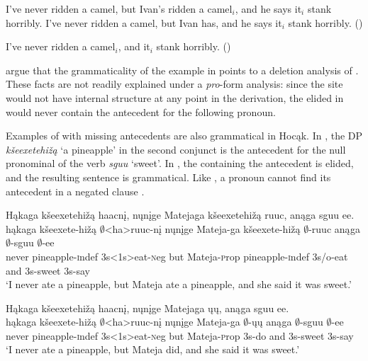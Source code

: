 \documentclass[output=paper]{LSP/langsci}
\begin{document}
 
\ea
\ea\label{ex:johnson:49a}
I've never ridden a camel, but Ivan's ridden a camel$_i$, and he says it$_i$ stank horribly.
\vspace{12pt}
\ex\label{ex:johnson:49b} 
I've never ridden a camel, but Ivan has, and he says it$_i$ stank horribly. (\citealt[403]{HankamerSag1976})
\z
\z
 
\ea\label{ex:johnson:50}
I've never ridden a camel$_i$, and it$_i$ stank horribly. (\citealt[404]{HankamerSag1976})
\z 

\citet{HankamerSag1976} argue that the grammaticality of the example in  points to a deletion analysis of . These facts are not readily explained under a \emph{pro}-form analysis: since the  site would not have internal structure at any point in the derivation, the elided  in  would never contain the antecedent for the following pronoun. 

Examples of  with missing antecedents are also grammatical in Hocąk. In , the DP \emph{kšeexetehižą} `a pineapple' in the second conjunct is the antecedent for the null pronominal  of the verb \emph{sguu} `sweet'. In , the  containing the antecedent is elided, and the resulting sentence is grammatical. Like , a pronoun cannot find its antecedent in a negated clause .
 
\ea
\ea\label{ex:johnson:51a} 
\glll Hąkaga kšeexetehižą haacnį, nųnįge Matejaga kšeexetehižą ruuc, anąga sguu ee.\\
hąkaga kšeexete-hižą $\emptyset$<ha>ruuc-nį nųnįge Mateja-ga kšeexete-hižą $\emptyset$-ruuc anąga $\emptyset$-sguu $\emptyset$-ee\\
never pineapple-{\textsc indef} {\textsc 3s<1s>}eat-{\textsc neg} but Mateja-{\textsc prop} pineapple-{\textsc indef} {\textsc 3s/o}-eat and {\textsc 3s}-sweet {\textsc 3s}-say\\
\trans `I never ate a pineapple, but Mateja ate a pineapple, and she said it was sweet.'
 
\ex\label{ex:johnson:51b} 
\glll Hąkaga kšeexetehižą haacnį, nųnįge Matejaga ųų, anąga sguu ee.\\
hąkaga kšeexete-hižą $\emptyset$<ha>ruuc-nį nųnįge Mateja-ga $\emptyset$-ųų anąga $\emptyset$-sguu $\emptyset$-ee\\
never pineapple-{\textsc indef} {\textsc 3s<1s>}eat-{\textsc neg} but Mateja-{\textsc prop} {\textsc 3s}-do and {\textsc 3s}-sweet {\textsc 3s}-say\\
\trans `I never ate a pineapple, but Mateja did, and she said it was sweet.'
\z
\z
 
\end{document}
